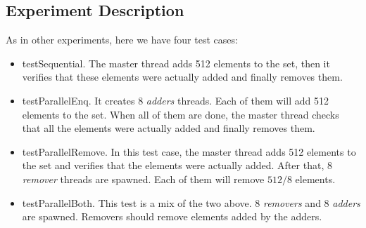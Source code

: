 \subsection{Experiment Description}
\par
As in other experiments, here we have four test cases:
\begin{itemize}
\item testSequential. The master thread adds 512 elements to the set, then it
verifies that these elements were actually added and finally removes them.
\item testParallelEnq. It creates 8 \textit{adders} threads. Each of them will
add 512 elements to the set. When all of them are done, the master thread
checks that all the elements were actually added and finally removes them.
\item testParallelRemove. In this test case, the master thread adds 512
elements to the set and verifies that the elements were actually added. After
that, 8 \textit{remover} threads are spawned. Each of them will remove $512/8$
elements. 
\item testParallelBoth. This test is a mix of the two above. 8
\textit{removers} and 8 \textit{adders} are spawned. Removers should remove
elements added by the adders.
\end{itemize}
\par
